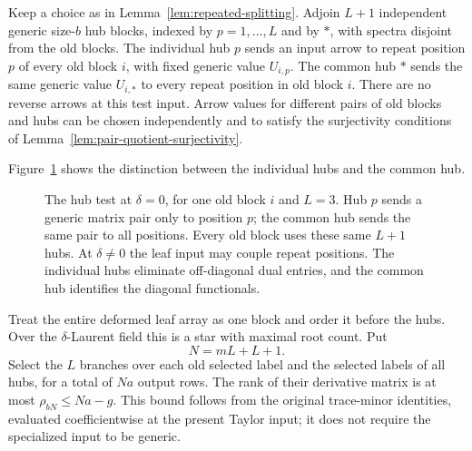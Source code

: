 Keep a choice as in Lemma~\ref{lem:repeated-splitting}. Adjoin
\(L+1\) independent generic size-\(b\) hub blocks, indexed by
\(p=1,\ldots,L\) and by \(*\), with spectra disjoint from the
old blocks. The individual hub \(p\) sends an input arrow to
repeat position \(p\) of every old block \(i\), with fixed generic
value \(U_{i,p}\). The common hub \(*\) sends the same generic
value \(U_{i,*}\) to every repeat position in old block \(i\).
There are no reverse arrows at this test input. Arrow values for
different pairs of old blocks and hubs can be chosen independently
and to satisfy the surjectivity conditions of
Lemma~\ref{lem:pair-quotient-surjectivity}.

Figure~\ref{fig:hub-test} shows the distinction between the individual
hubs and the common hub.

\begin{figure}[tbp]
\centering

\caption{The hub test at $\delta=0$, for one old block $i$ and $L=3$.
Hub $p$ sends a generic matrix pair only to position $p$; the common hub
sends the same pair to all positions. Every old block uses these same
$L+1$ hubs. At $\delta\ne0$ the leaf input may couple repeat positions.
The individual hubs eliminate off-diagonal dual entries, and the common
hub identifies the diagonal functionals.}
\label{fig:hub-test}
\end{figure}

Treat the entire deformed leaf array as one block and order it
before the hubs. Over the \(\delta\)-Laurent field this is a star
with maximal root count. Put
\[
 N=mL+L+1.
\]
Select the \(L\) branches over each old selected label and the
selected labels of all hubs, for a total of \(Na\) output rows.
The rank of their derivative matrix is at most
\(\rho_{bN}\leq Na-g\). This bound follows from the original
trace-minor identities, evaluated coefficientwise at the present
Taylor input; it does not require the specialized input to be
generic.

